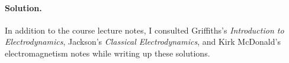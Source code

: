 \documentclass[11pt]{article}
\newenvironment{solution}
{
    \paragraph{Solution.}
    \ignorespaces
}
{
    \bigskip
}
\begin{document}
\begin{solution}
\end{solution}


\vfill
In addition to the course lecture notes, I consulted Griffiths's \emph{Introduction to Electrodynamics}, Jackson's \emph{Classical Electrodynamics}, and Kirk McDonald's electromagnetism notes while writing up these solutions.
\end{document}
